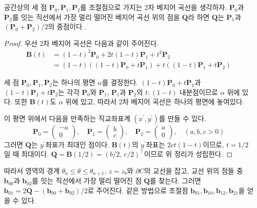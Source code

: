 \documentclass{Humantech_Paper_Awardfullpaper_hutech}
\begin{document}
\begin{thm}
	공간상의 세 점 $\mathbf{P}_0, \mathbf{P}_1, \mathbf{P}_2$를 조절점으로 가지는 2차 베지어 곡선을 생각하자. $\mathbf{P}_0$과 $\mathbf{P}_2$를 잇는 직선에서 가장 멀리 떨어진 베지어 곡선 위의 점을 $\mathbf{Q}$라 하면 $\mathbf{Q}$는 $\mathbf{P}_1$과 $(\mathbf{P}_0 + \mathbf{P}_2) / 2$의 중점이다 \cite{last year}.
\end{thm}
\begin{proof}
	우선 2차 베지어 곡선은 다음과 같이 주어진다. 
	\begin{align*}
		\mathbf{B}(t) &= (1-t)^2 \mathbf{P}_0 + 2t(1-t) \mathbf{P}_1 + t^2 \mathbf{P}_2 \\
		&= (1-t)((1-t)\mathbf{P}_0 + t\mathbf{P}_1) + t((1-t)\mathbf{P}_1 + t\mathbf{P}_2)
	\end{align*}
	
	세 점 $\mathbf{P}_0, \mathbf{P}_1, \mathbf{P}_2$는 하나의 평면 $\alpha$를 결정한다. $(1-t)\mathbf{P}_0 + t\mathbf{P}_1$과 $(1-t)\mathbf{P}_1 + t \mathbf{P}_2$는 각각 $\mathbf{P}_0$와 $\mathbf{P}_1$, $\mathbf{P}_1$과 $\mathbf{P}_2$의 $t \colon (1-t)$ 내분점이므로 $\alpha$ 위에 있다. 또한 $\mathbf{B}(t)$도 $\alpha$ 위에 있고, 따라서 2차 베지어 곡선은 하나의 평면에 놓여있다. 
	
	이 평면 위에서 다음을 만족하는 직교좌표계 $(x^\prime, y^\prime)$를 만들 수 있다.
	$$ \mathbf{P}_0 = \begin{pmatrix} -a \\ 0 \end{pmatrix}, \quad \mathbf{P}_1 = \begin{pmatrix} b \\ c \end{pmatrix}, \quad \mathbf{P}_2 = \begin{pmatrix} a \\ 0 \end{pmatrix}, \quad (a, b, c > 0) $$
	그러면 $\mathbf{Q}$는 $y^\prime$좌표가 최대인 점이다. $\mathbf{B}(t)$의 $y^\prime$좌표는 $2ct(1-t)$이므로, $t = 1/2$일 때 최대이다. $\mathbf{Q} = \mathbf{B}(1/2) = (b/2, \, c/2)^\intercal$이므로 위 정리가 성립한다. 
\end{proof}

따라서 영역의 경계 $\theta_a \leq \theta \leq \theta_{a+1}, \, z = z_b$와 $\partial C$의 교선을 잡고, 교선 위의 점들 중 $\mathbf{b}_{00}$과 $\mathbf{b}_{02}$를 잇는 직선에서 가장 멀리 떨어진 점 $\mathbf{Q}$를 찾는다. 그러면 $\mathbf{b}_{01} = 2\mathbf{Q} - (\mathbf{b}_{00} + \mathbf{b}_{02})/2$로 주어진다. 같은 방법으로 조절점 $\mathbf{b}_{01}, \mathbf{b}_{10}, \mathbf{b}_{12}, \mathbf{b}_{21}$을 얻을 수 있다. 
\end{document}
